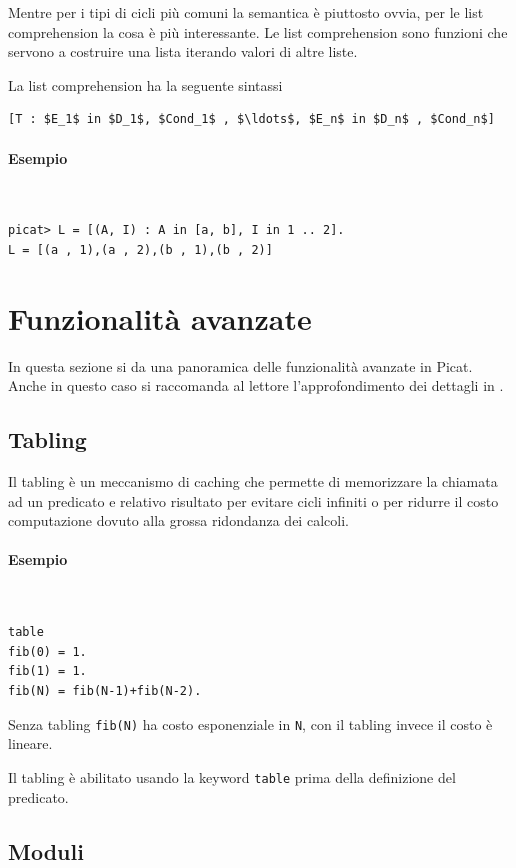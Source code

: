 \documentclass[12pt,a4paper,openright]{book} %
\begin{document}
Mentre per i tipi di cicli più comuni la semantica è piuttosto ovvia,
per le list comprehension la cosa è più interessante. Le list
comprehension sono funzioni che servono a costruire una lista iterando
valori di altre liste.

La list comprehension ha la seguente sintassi
\begin{lstlisting}
[T : $E_1$ in $D_1$, $Cond_1$ , $\ldots$, $E_n$ in $D_n$ , $Cond_n$]
\end{lstlisting}

\paragraph{Esempio}\
\begin{lstlisting}
picat> L = [(A, I) : A in [a, b], I in 1 .. 2].
L = [(a , 1),(a , 2),(b , 1),(b , 2)]
\end{lstlisting}

\section{Funzionalità avanzate}
\label{sec:picat_advanced}

In questa sezione si da una panoramica delle funzionalità avanzate in
Picat. Anche in questo caso si raccomanda al lettore l'approfondimento
dei dettagli in \cite{PicatGuide}.

\subsection{Tabling}
\label{subsec:picat_advanced_tabling}

Il tabling è un meccanismo di caching che permette di memorizzare la
chiamata ad un predicato e relativo risultato per evitare cicli
infiniti o per ridurre il costo computazione dovuto alla grossa
ridondanza dei calcoli.

\paragraph{Esempio}\
\begin{lstlisting}
table
fib(0) = 1.
fib(1) = 1.
fib(N) = fib(N-1)+fib(N-2).
\end{lstlisting}
Senza tabling \verb|fib(N)| ha costo esponenziale in \verb|N|, con il
tabling invece il costo è lineare.

Il tabling è abilitato usando la keyword \verb|table| prima della
definizione del predicato.

\subsection{Moduli}
\label{subsec:picat_advanced_modules}
\end{document}
